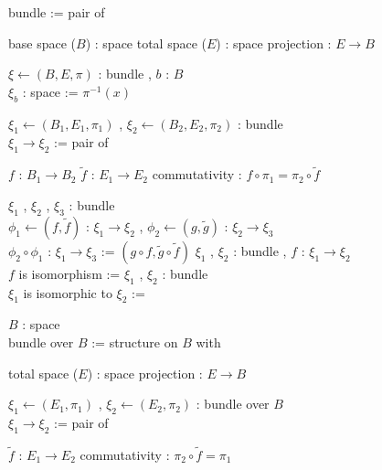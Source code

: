 \begin{Definition}[一般の束]
\itemdefi
  \Define bundle := pair of
  \begin{itemize}
    \itemenum base space (\(B\)) : space
    \itemenum total space (\(E\)) : space
    \itemenum projection : \(E \to B\)
  \end{itemize}
\itemdefi
  \For \(\xi \leftarrow (B , E , \pi)\) : bundle , \(b\) : \(B\) \\
  \Define \(\xi_b\) : space := \(\pi^{-1}(x)\)
\end{Definition}

\begin{Definition}
\itemdefi
  \For \(\xi_1 \leftarrow (B_1 , E_1 , \pi_1)\) , \(\xi_2 \leftarrow (B_2 , E_2 , \pi_2)\) : bundle \\
  \Define \(\xi_1 \to \xi_2\) := pair of
  \begin{itemize}
    \itemenum \(f\) : \(B_1 \to B_2\)
    \itemenum \(\tilde{f}\) : \(E_1 \to E_2\)
    \itemwith commutativity : \(f \circ \pi_1 = \pi_2 \circ \tilde{f}\)
  \end{itemize}
\itemdefi
  \For \(\xi_1\) , \(\xi_2\) , \(\xi_3\) : bundle \\
  \For \(\phi_1 \leftarrow (f , \tilde{f})\) : \(\xi_1 \to \xi_2\) , \(\phi_2 \leftarrow (g , \tilde{g})\) : \(\xi_2 \to \xi_3\) \\
  \Define \(\phi_2 \circ \phi_1\) : \(\xi_1 \to \xi_3\) := \((g \circ f , \tilde{g} \circ \tilde{f})\)
\itemdefi
  \For \(\xi_1\) , \(\xi_2\) : bundle , \(f\) : \(\xi_1 \to \xi_2\) \\
  \Define \(f\) is isomorphism := 
\itemdefi
  \For \(\xi_1\) , \(\xi_2\) : bundle \\
  \Define \(\xi_1\) is isomorphic to \(\xi_2\) := 
\end{Definition}

\begin{Definition}[空間の上の束]
\itemdefi
  \For \(B\) : space \\
  \Define bundle over \(B\) := structure on \(B\) with
  \begin{itemize}
    \itemenum total space (\(E\)) : space
    \itemenum projection : \(E \to B\)
  \end{itemize}
\itemdefi
  \For \(\xi_1 \leftarrow (E_1 , \pi_1)\) , \(\xi_2 \leftarrow (E_2 , \pi_2)\) : bundle over \(B\) \\
  \Define \(\xi_1 \to \xi_2\) := pair of
  \begin{itemize}
    \itemenum \(\tilde{f}\) : \(E_1 \to E_2\)
    \itemwith commutativity : \(\pi_2 \circ \tilde{f} = \pi_1\)
  \end{itemize}
\end{Definition}

